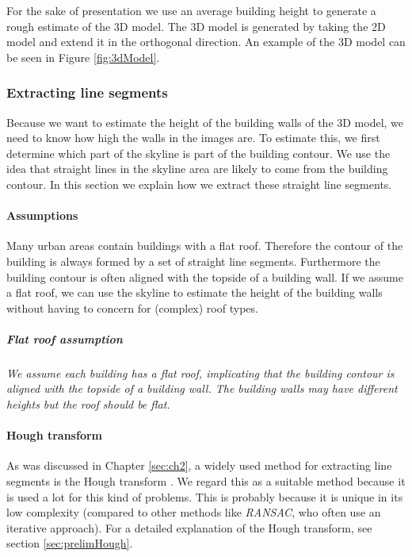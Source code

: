For the sake of presentation we use an average building height to generate a
rough estimate of the 3D model.  The 3D model is generated by taking the 2D model
and extend it in the orthogonal direction.  An example of the 3D model can
be seen in Figure \ref{fig:3dModel}.





\subsubsection{Extracting line segments}
\label{extractinglinesegments}
	Because we want to estimate the height of the building walls of the 3D
	model, we need to know how high the walls in the images are.  To estimate
	this, we first determine which part of the skyline is part of the building
	contour.  We use the idea that straight lines in the skyline area are likely
	to come from the building contour. In this section we explain how we extract
	these straight line segments.

\paragraph{Assumptions}
	Many urban areas contain buildings with a flat roof. Therefore the contour
	of the building is always formed by a set of straight line segments.
	Furthermore the building contour is often aligned with the topside of a building wall.
	If we assume a flat roof, we can use the skyline to estimate the height of
	the building walls without having to concern for (complex) roof types.

	\subparagraph{Flat roof assumption}
	\emph{We assume each building has a flat roof, implicating that the building
	contour is aligned with the topside of a building wall.  The building walls
	may have different heights but the roof should be flat.}\\


\paragraph{Hough transform}
	As was discussed in Chapter \ref{sec:ch2}, a widely used method for extracting line segments is the Hough transform \cite{Hough}.
	We regard this as a suitable method because it is
	used a lot for this kind of problems. This is probably because it is unique
	in its low complexity (compared to other methods like
	\emph{RANSAC}, who often use an iterative approach).
	For a detailed explanation of the Hough transform, see section \ref{sec:prelimHough}.\\

